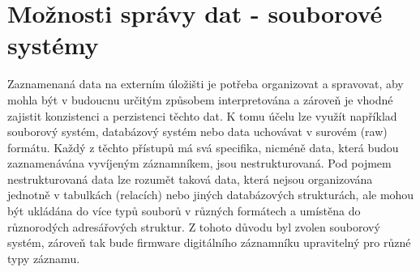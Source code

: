 




\section{Možnosti správy dat - souborové systémy}
Zaznamenaná data na externím úložišti je potřeba organizovat a spravovat, aby mohla být v budoucnu určitým způsobem interpretována a zároveň je vhodné zajistit konzistenci a perzistenci těchto dat. K tomu účelu lze využít například souborový systém, databázový systém nebo data uchovávat v surovém (raw) formátu. Každý z těchto přístupů má svá specifika, nicméně data, která budou zaznamenávána vyvíjeným záznamníkem, jsou nestrukturovaná. Pod pojmem nestrukturovaná data lze rozumět taková data, která nejsou organizována jednotně v tabulkách (relacích) nebo jiných databázových strukturách, ale mohou být ukládána do více typů souborů v různých formátech a umístěna do různorodých adresářových struktur. Z tohoto důvodu byl zvolen souborový systém, zároveň tak bude firmware digitálního záznamníku upravitelný pro různé typy záznamu. \cite{weka_structured_unstructured_data, virginia_tech_file_database_systems}

